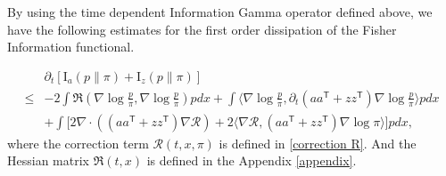 \documentclass[11pt,reqno]{amsart}
\newcommand{\la}{\langle}
\newcommand{\ra}{\rangle}
\newcommand{\ts}{\mathsf{T}}
\def\pa{\partial}
\begin{document}
By using the time dependent Information Gamma operator defined above, we have the following estimates for the first order dissipation of the Fisher Information functional.
\begin{proposition}\label{prop: Fisher information decay}
    \begin{equation}
    \begin{split}
             &\partial_t [\mathrm I_a(p\|\pi ) + \mathrm I_z(p\|\pi) ]\\
              \le &-2\int  \mathfrak R(\nabla \log\frac{{p} }{\pi},\nabla \log\frac{{p} }{\pi})p  dx+\int \la \nabla\log\frac{{p} }{\pi},\pa_t(aa^{\ts}+zz^{\ts})\nabla\log\frac{{p} }{\pi}\ra {p}  dx\\
& +\int\big[
2\nabla\cdot((aa^{\ts}+zz^{\ts})\nabla\mathcal{R})+2\la \nabla \mathcal R,( aa^{\ts}+zz^{\ts})\nabla\log\pi\ra \big]{p}  dx,
              \end{split}
    \end{equation}
where the correction term $\mathcal R(t,x,\pi)$ is defined in \eqref{correction R}. And the Hessian matrix $\mathfrak R(t,x)$ is defined in the Appendix \ref{appendix}.
\end{proposition}
\end{document}
